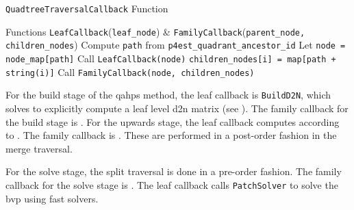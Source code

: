 \begin{algorithm}
\caption{\texttt{QuadtreeTraversalCallback} Function}
\begin{algorithmic}[0]
    \Require Functions \texttt{LeafCallback}(\texttt{leaf\_node}) \& \texttt{FamilyCallback}(\texttt{parent\_node, children\_nodes})
    \State Compute \texttt{path} from \texttt{p4est\_quadrant\_ancestor\_id}
    \State Let \texttt{node = node\_map[path]}
     
        \State Call \texttt{LeafCallback(node)}
    \Else {}
            \State \texttt{children\_nodes[i] = map[path + string(i)]}
        \EndFor
        \State Call \texttt{FamilyCallback(node, children\_nodes)}
    \EndIf
\end{algorithmic}
\label{alg:quadtree_callback}
\end{algorithm}

For the build stage of the \gls{qahps} method, the leaf callback is \texttt{BuildD2N}, which solves  to explicitly compute a leaf level \gls{d2n} matrix (see ). The family callback for the build stage is . For the upwards stage, the leaf callback computes \htau according to . The family callback is . These are performed in a post-order fashion in the merge traversal.

For the solve stage, the split traversal is done in a pre-order fashion. The family callback for the solve stage is . The leaf callback calls \texttt{PatchSolver} to solve the \gls{bvp} using fast solvers.